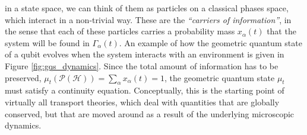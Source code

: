 \documentclass[%
 reprint,
 superscriptaddress,
 aps,
 pra,
]{revtex4-2}
\newcommand{\PH}{\mathcal{P}(\mathcal{H})}
\theoremstyle{definition}
\begin{document}
in a state space, we can think of them as particles on a classical phases space, 
which interact in a non-trivial way. These are the \emph{``carriers of information''}, in the sense that each of 
these particles carries a probability mass $x_\alpha(t)$ that the system will be found in $\Gamma_\alpha(t)$.
An example of how the geometric quantum state of a qubit evolves when the system 
interacts with an environment is given in Figure \ref{fig:gqs_dynamics}. Since the total amount 
of information has to be preserved, $\mu_t(\PH) = \sum_\alpha x_\alpha(t) =1$,
the geometric quantum state $\mu_t$ must satisfy a continuity equation. Conceptually, this is 
the starting point of virtually all transport theories, which deal with quantities that are globally 
conserved, but that are moved around as a result of the underlying microscopic dynamics.
\end{document}
